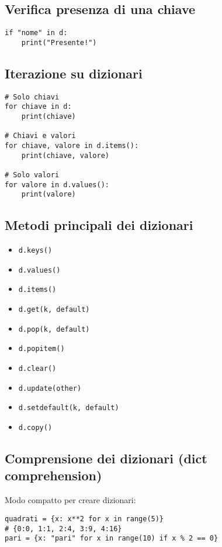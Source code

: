 \documentclass[a4paper,12pt]{article}
\begin{document}
\subsection*{Verifica presenza di una chiave}
\begin{lstlisting}
if "nome" in d:
    print("Presente!")
\end{lstlisting}

\subsection*{Iterazione su dizionari}
\begin{lstlisting}
# Solo chiavi
for chiave in d:
    print(chiave)

# Chiavi e valori
for chiave, valore in d.items():
    print(chiave, valore)

# Solo valori
for valore in d.values():
    print(valore)
\end{lstlisting}

\subsection*{Metodi principali dei dizionari}
\begin{multicols}{2}
\begin{itemize}
    \item \texttt{d.keys()}           %
    \item \texttt{d.values()}         %
    \item \texttt{d.items()}          %
    \item \texttt{d.get(k, default)}  %
    \item \texttt{d.pop(k, default)}  %
    \item \texttt{d.popitem()}        %
    \item \texttt{d.clear()}          %
    \item \texttt{d.update(other)}    %
    \item \texttt{d.setdefault(k, default)} %
    \item \texttt{d.copy()}           %
\end{itemize}
\end{multicols}

\subsection*{Comprensione dei dizionari (dict comprehension)}
Modo compatto per creare dizionari:
\begin{lstlisting}
quadrati = {x: x**2 for x in range(5)}
# {0:0, 1:1, 2:4, 3:9, 4:16}
pari = {x: "pari" for x in range(10) if x % 2 == 0}
\end{lstlisting}
\end{document}
